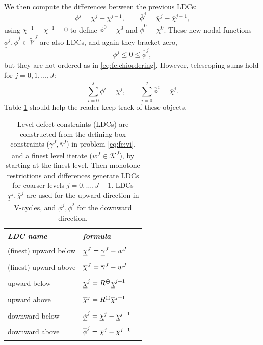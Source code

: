 \documentclass[letterpaper,final,12pt,reqno]{amsart}
\theoremstyle{cstyle}
\theoremstyle{cstyle*}
\theoremstyle{dstyle}
\numberwithin{equation}{section}
\numberwithin{figure}{section}
\numberwithin{table}{section}
\numberwithin{theorem}{section}
\newcommand{\cK}{\mathcal{K}}
\newcommand{\maxR}{R^{\bm{\oplus}}}
\newcommand{\minR}{R^{\bm{\ominus}}}
\begin{document}
We then compute the differences between the previous LDCs:
\begin{equation}
\underline{\phi}^j = \underline{\chi}^j - \underline{\chi}^{j-1}, \qquad \overline{\phi}^j = \overline{\chi}^j - \overline{\chi}^{j-1},  \label{eq:fe:philevels}
\end{equation}
using $\underline{\chi}^{-1}=\overline{\chi}^{-1}=0$ to define $\underline{\phi}^0=\underline{\chi}^0$ and $\overline{\phi}^0=\overline{\chi}^0$.  These new nodal functions $\underline{\phi}^{j},\overline{\phi}^{j} \in \tilde{\mathcal{V}}^J$ are also LDCs, and again they bracket zero,
\begin{equation}
\underline{\phi}^j \le 0 \le \overline{\phi}^j,  \label{eq:fe:phibrackets}
\end{equation}
but they are not ordered as in \eqref{eq:fe:chiordering}.  However, telescoping sums hold for $j=0,1,\dots,J$:
\begin{equation}
\sum_{i=0}^j \underline{\phi}^i = \underline{\chi}^j, \qquad \sum_{i=0}^j \overline{\phi}^i = \overline{\chi}^j.  \label{eq:fe:telescoping}
\end{equation}
Table \ref{tab:ldcs} should help the reader keep track of these objects.

\begin{table}
\begin{tabular}{llc}
\emph{LDC name}        & \emph{formula} \\ \hline
(finest) upward below & ${\Large \strut} \underline{\chi}^J = \underline{\gamma}^J - w^J$ \\
(finest) upward above & ${\Large \strut} \overline{\chi}^J = \overline{\gamma}^J - w^J$ \\
upward below          & ${\Large \strut} \underline{\chi}^{j} = \maxR \underline{\chi}^{j+1}$ \\
upward above          & ${\Large \strut} \overline{\chi}^{j} = \minR \overline{\chi}^{j+1}$ \\
downward below        & ${\Large \strut} \underline{\phi}^j = \underline{\chi}^j - \underline{\chi}^{j-1}$ \\
downward above        & ${\Large \strut} \overline{\phi}^j = \overline{\chi}^j - \overline{\chi}^{j-1}$ \\
\end{tabular}

\medskip
\caption{Level defect constraints (LDCs) are constructed from the defining box constraints ($\underline{\gamma}^J,\overline{\gamma}^J$) in problem \eqref{eq:fe:vi}, and a finest level iterate ($w^J \in \cK^J$), by starting at the finest level.  Then monotone restrictions and differences generate LDCs for coarser levels $j=0,\dots,J-1$.  LDCs $\underline{\chi}^j,\overline{\chi}^j$ are used for the upward direction in V-cycles, and $\underline{\phi}^j,\overline{\phi}^j$ for the downward direction.}
\label{tab:ldcs}
\end{table}
\end{document}
